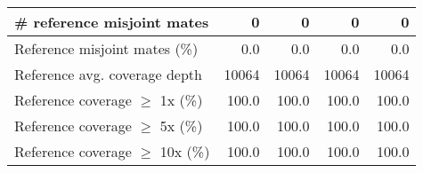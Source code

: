 \documentclass[12pt,a4paper]{article}
\begin{document}
\begin{table}[ht]
\begin{center}
\begin{tabular}{|l*{4}{|r}|}
\# reference misjoint mates & 0 & 0 & 0 & 0 \\ \hline
Reference misjoint mates (\%) & 0.0 & 0.0 & 0.0 & 0.0 \\ \hline
Reference avg. coverage depth & 10064 & 10064 & 10064 & 10064 \\ \hline
Reference coverage $\geq$ 1x (\%) & 100.0 & 100.0 & 100.0 & 100.0 \\ \hline
Reference coverage $\geq$ 5x (\%) & 100.0 & 100.0 & 100.0 & 100.0 \\ \hline
Reference coverage $\geq$ 10x (\%) & 100.0 & 100.0 & 100.0 & 100.0 \\ \hline
\end{tabular}
\end{center}
\end{table}
\end{document}
